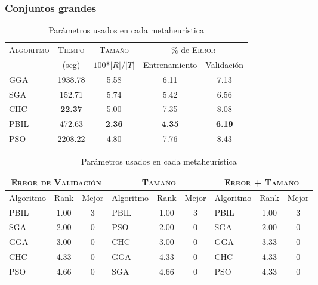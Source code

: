 \blindtext

\subsubsection{Conjuntos grandes}

\blindtext

\begin{table}[h!]
\centering
\begin{tabular}{l c c c c}
\hline
\multirow{2}{*}{\textsc{Algoritmo}}
	& \textsc{Tiempo} & \textsc{Tamaño}
	& \multicolumn{2}{c}{$\%$ de \textsc{Error}} \\\cline{4-5}
 & \scriptsize{(seg)} & \scriptsize{$100*\vert R \vert / \vert T \vert$}
	& \scriptsize{Entrenamiento} & \scriptsize{Validación} \\
\hline
\hline
GGA  & 1938.78 & 5.58 & 6.11 & 7.13 \\
SGA  &  152.71 & 5.74 & 5.42 & 6.56 \\
CHC  & \textbf{22.37} & 5.00 & 7.35 & 8.08 \\
PBIL &  472.63 & \textbf{2.36} & \textbf{4.35} & \textbf{6.19} \\
PSO  & 2208.22 & 4.80 & 7.76 & 8.43 \\
\hline
\end{tabular}
\caption{Parámetros usados en cada metaheurística}
\label{res-big}
\end{table}

\blindtext

\begin{table}[h!]
\centering
\begin{tabular}{l c c|l c c|l c c}
\hline
\multicolumn{3}{c|}{\textsc{Error de Validación}}
	& \multicolumn{3}{c|}{\textsc{Tamaño}}
	& \multicolumn{3}{c}{\textsc{Error + Tamaño}} \\
\hline
Algoritmo & Rank & Mejor & Algoritmo & Rank & Mejor & Algoritmo & Rank & Mejor \\
\hline
\hline
PBIL & 1.00 & 3 & PBIL & 1.00 & 3 & PBIL & 1.00 & 3 \\
SGA  & 2.00 & 0 & PSO  & 2.00 & 0 & SGA  & 2.00 & 0 \\
GGA  & 3.00 & 0 & CHC  & 3.00 & 0 & GGA  & 3.33 & 0 \\
CHC  & 4.33 & 0 & GGA  & 4.33 & 0 & CHC  & 4.33 & 0 \\
PSO  & 4.66 & 0 & SGA  & 4.66 & 0 & PSO  & 4.33 & 0 \\
\hline
\end{tabular}
\caption{Parámetros usados en cada metaheurística}
\label{res-big-rank}
\end{table}

